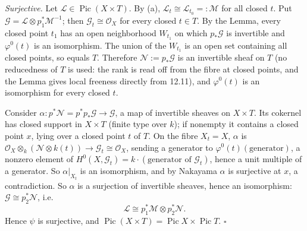 \documentclass[11pt]{article}
\begin{document}
\emph{Surjective.} Let $\mathcal L\in\operatorname{Pic}(X\times T)$. By (a), $\mathcal L_t\cong\mathcal L_{t_0}=:\mathcal M$ for all closed $t$. Put $\mathcal G=\mathcal L\otimes p_1^*\mathcal M^{-1}$; then $\mathcal G_t\cong\mathcal O_X$ for every closed $t\in T$. By the Lemma, every closed point $t_1$ has an open neighborhood $W_{t_1}$ on which $p_*\mathcal G$ is invertible and $\varphi^0(t)$ is an isomorphism. The union of the $W_{t_1}$ is an open set containing all closed points, so equals $T$. Therefore $\mathcal N:=p_*\mathcal G$ is an invertible sheaf on $T$ (no reducedness of $T$ is used: the rank is read off from the fibre at closed points, and the Lemma gives local freeness directly from 12.11), and $\varphi^0(t)$ is an isomorphism for every closed $t$.

Consider $\alpha\colon p^*\mathcal N=p^*p_*\mathcal G\to\mathcal G$, a map of invertible sheaves on $X\times T$. Its cokernel has closed support in $X\times T$ (finite type over $k$); if nonempty it contains a closed point $x$, lying over a closed point $t$ of $T$. On the fibre $X_t=X$, $\alpha$ is $\mathcal O_X\otimes_k(\mathcal N\otimes k(t))\to\mathcal G_t\cong\mathcal O_X$, sending a generator to $\varphi^0(t)(\text{generator})$, a nonzero element of $H^0(X,\mathcal G_t)=k\cdot(\text{generator of }\mathcal G_t)$, hence a unit multiple of a generator. So $\alpha|_{X_t}$ is an isomorphism, and by Nakayama $\alpha$ is surjective at $x$, a contradiction. So $\alpha$ is a surjection of invertible sheaves, hence an isomorphism: $\mathcal G\cong p_2^*\mathcal N$, i.e.
\[
\mathcal L\cong p_1^*\mathcal M\otimes p_2^*\mathcal N .
\]
Hence $\psi$ is surjective, and $\operatorname{Pic}(X\times T)=\operatorname{Pic}X\times\operatorname{Pic}T$. \hfill$\square$
\end{document}
